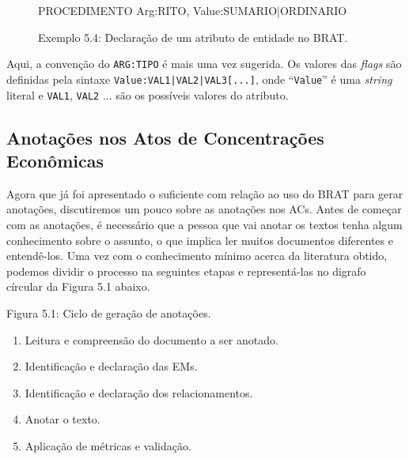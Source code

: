 \documentclass[11pt]{report}
\newcommand{\quotes}[1]{``#1''}
\begin{document}
\begin{figure}[h!]
\centering
\begin{boxedverbatim}
[attributes]

PROCEDIMENTO  Arg:RITO, Value:SUMARIO|ORDINARIO
\end{boxedverbatim}
\caption*{Exemplo 5.4: Declaração de um atributo de entidade no BRAT.}
\end{figure}

Aqui, a convenção do \texttt{ARG:TIPO} é mais uma vez sugerida. Os valores das \textit{flags} são definidas pela sintaxe \texttt{Value:VAL1|VAL2|VAL3[...]}, onde
\quotes{\texttt{Value}} é uma \textit{string} literal e \texttt{VAL1}, \texttt{VAL2} ... são os possíveis valores do atributo.

\subsection{Anotações nos Atos de Concentrações Econômicas}

\indent\indent Agora que já foi apresentado o suficiente com relação ao uso do BRAT para gerar anotações, discutiremos um pouco sobre as anotações nos ACs. Antes de começar
com as anotações, é necessário que a pessoa que vai anotar os textos tenha algum conhecimento sobre o assunto, o que implica ler muitos documentos diferentes e entendê-los.
Uma vez com o conhecimento mínimo acerca da literatura obtido, podemos dividir o processo na seguintes etapas e representá-las no digrafo círcular da Figura 5.1 abaixo.

\begin{center}
\end{center}

\begin{center}
  Figura 5.1: Ciclo de geração de anotações.
\end{center}

\begin{enumerate}[label=\textbf{{\arabic*.}}]
\item Leitura e compreensão do documento a ser anotado.
\item Identificação e declaração das EMs.
\item Identificação e declaração dos relacionamentos.
\item Anotar o texto.
\item Aplicação de métricas e validação.
\end{enumerate}
\end{document}
